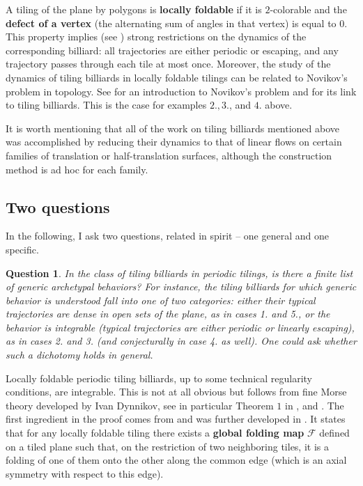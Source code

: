 \documentclass[11pt]{article}
\newtheorem{question}[theorem]{Question}
\theoremstyle{definition}
\begin{document}
A tiling of the plane by polygons is \textbf{locally foldable} if it is $2$-colorable and the \textbf{defect of a vertex} (the alternating sum of angles in that vertex) is equal to $0$. This property implies (see \cite{TAF}) strong restrictions on the dynamics of the corresponding billiard: all trajectories are either periodic or escaping, and any trajectory passes through each tile at most once. Moreover, the study of the dynamics of tiling billiards in locally foldable tilings can be related to Novikov's problem in topology. See \cite{Dynnikov_main} for an introduction to Novikov's problem and \cite{PaRoH, Dynnikovetal} for its link to tiling billiards. This is the case for examples $2., 3.$, and $4.$ above.

It is worth mentioning that all of the work on tiling billiards mentioned above was accomplished by reducing their dynamics to that of linear flows on certain families of translation or half-translation surfaces, although the construction method is ad hoc for each family. 


\subsection*{Two questions}
In the following, I ask two questions, related in spirit -- one general and one specific.

\begin{question} In the class of tiling billiards in periodic tilings, is there a finite list of generic archetypal behaviors? For instance, the tiling billiards for which generic behavior is understood fall into one of two categories: either their typical trajectories are dense in open sets of the plane, as in cases 1. and 5., or the behavior is integrable (typical trajectories are either periodic or linearly escaping), as in cases 2. and 3. (and conjecturally in case 4. as well). One could ask whether such a dichotomy holds in general.
\end{question}

Locally foldable periodic tiling billiards, up to some technical regularity conditions, are integrable. This is not at all obvious but follows from fine Morse theory developed by Ivan Dynnikov, see in particular Theorem $1$ in \cite{Dynnikov_main}, and \cite{PaRoH}. The first ingredient in the proof comes from \cite{BDFI18} and was further developed in \cite{TAF, PaRoH}. It states that for any locally foldable tiling there exists a \textbf{global folding map} $\mathcal{F}$ defined on a tiled plane such that, on the restriction of two neighboring tiles, it is a folding of one of them onto the other along the common edge (which is an axial symmetry with respect to this edge). 
\end{document}
